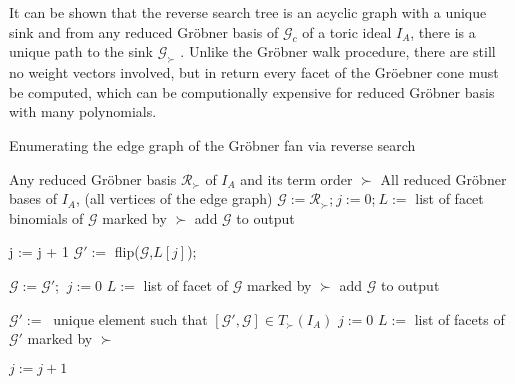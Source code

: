 \newpage

It can be shown that the reverse search tree is an acyclic graph with a unique sink and from any reduced Gröbner basis of $\mathcal{G}_{c} $ of a toric ideal $I_{A}$, there is a unique path to the sink $\mathcal{G}_{\succ}$ \cite{tigers} .
Unlike the Gröbner walk procedure, there are still no weight vectors involved, but in return every facet of the Gröebner cone must be computed, which can be computionally expensive for reduced Gröbner basis with many polynomials.

\begin{algorithm}
\caption{Enumerating the edge graph of the Gröbner fan via reverse search \cite{tigers}}
\label{alg:reverse}
\begin{algorithmic}[1]

\Input
Any reduced Gröbner basis $ \mathcal{R}_{\succ} $ of $I_A$ and its term order $\succ$
\Output All reduced Gröbner bases of $I_A$, (all vertices of the edge graph)
\State $\mathcal{G} := \mathcal{R}_{\succ}$;$~j := 0$;$~L := $ list of facet binomials of $\mathcal{G}$ marked by $\succ$
\State add $\mathcal{G}$ to output
\Repeat
{}

\State j := j + 1
\State $\mathcal{G}':= $ flip($\mathcal{G}$,$L[j]$);

\State $\mathcal{G} := \mathcal{G}' $;   $~j := 0$
\State $ L := $ list of facet of $\mathcal{G}$ marked by $\succ$
\State add $ \mathcal{G}$ to output

\EndIf 

\EndWhile

\State $\mathcal{G}' :=~$ unique element such that $[\mathcal{G}',\mathcal{G}] \in T_{\succ}(I_{A}) $
\State $j := 0$
\State $L := $ list of facets of $\mathcal{G}'$ marked by $\succ$

\Repeat
\State $j := j + 1$

\EndIf



\end{algorithmic}
\end{algorithm}

\newpage


